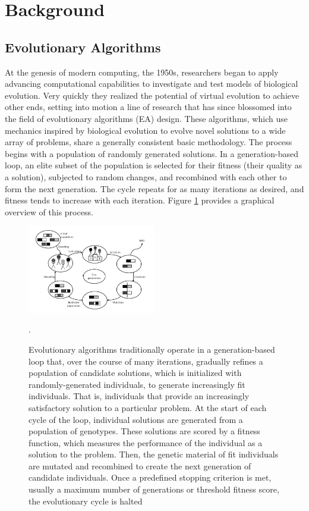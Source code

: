 \section{Background}
\subsection{Evolutionary Algorithms}
At the genesis of modern computing, the 1950s, researchers began to apply advancing computational capabilities to investigate and test models of biological evolution. Very quickly they realized the potential of virtual evolution to achieve other ends, setting into motion a line of research that has since blossomed into the field of evolutionary algorithms (EA) design. These algorithms, which use mechanics inspired by biological evolution to evolve novel solutions to a wide array of problems, share a generally consistent basic methodology. The process begins with a population of randomly generated solutions. In a generation-based loop, an elite subset of the population is selected for their fitness (their quality as a solution), subjected to random changes, and recombined with each other to form the next generation. The cycle repeats for as many iterations as desired, and fitness tends to increase with each iteration. Figure \ref{fig:working_principle} provides a graphical overview of this process.
\begin{figure}
\centering
\includegraphics[width=0.5\textwidth]{working_principle_of_EA.jpg}
\caption{\label{fig:working_principle} Evolutionary algorithms traditionally operate in a generation-based loop that, over the course of many iterations, gradually refines a population of candidate solutions, which is initialized with randomly-generated individuals, to generate increasingly fit individuals. That is, individuals that provide an increasingly satisfactory solution to a particular problem. At the start of each cycle of the loop, individual solutions are generated from a population of genotypes. These solutions are scored by a fitness function, which measures the performance of the individual as a solution to the problem. Then, the genetic material of fit individuals are mutated and recombined to create the next generation of candidate individuals. Once a predefined stopping criterion is met, usually a maximum number of generations or threshold fitness score, the evolutionary cycle is halted \cite{Prothmann2009EvolutionaryOptimisation}}.
\end{figure}


